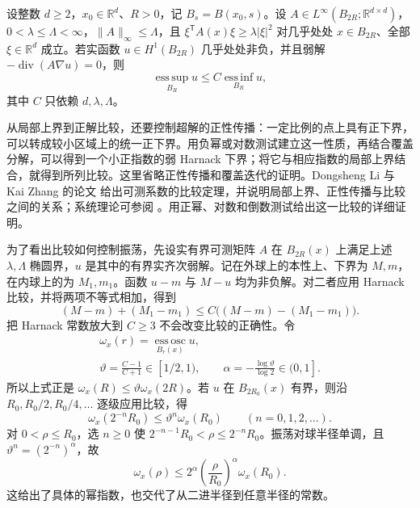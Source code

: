 \begin{theorem}
\label{b2:thm:16-measurable-harnack}
设整数 \(d\geq2\)，\(x_0\in\mathbb R^d\)、\(R>0\)，记 \(B_s=B(x_0,s)\)。设 \(A\in L^\infty(B_{2R};\mathbb R^{d\times d})\)，\(0<\lambda\leq\Lambda<\infty\)，\(\|A\|_\infty\leq\Lambda\)，且 \(\xi^{\mathsf T}A(x)\xi\geq\lambda|\xi|^2\) 对几乎处处 \(x\in B_{2R}\)、全部 \(\xi\in\mathbb R^d\) 成立。若实函数 \(u\in H^1(B_{2R})\) 几乎处处非负，并且弱解 \(-\operatorname{div}(A\nabla u)=0\)，则
\[\operatorname*{ess\,sup}_{B_R}u\le C\operatorname*{ess\,inf}_{B_R}u,\]
其中 \(C\) 只依赖 \(d,\lambda,\Lambda\)。
\end{theorem}
\begin{proofsketch}
从局部上界到正解比较，还要控制超解的正性传播：一定比例的点上具有正下界，可以转成较小区域上的统一正下界。用负幂或对数测试建立这一性质，再结合覆盖分解，可以得到一个小正指数的弱 Harnack 下界；将它与相应指数的局部上界结合，就得到所列比较。这里省略正性传播和覆盖迭代的证明。Dongsheng Li 与 Kai Zhang 的论文 \cite[Theorem 1.1 and Section 2]{Li2017Harnack} 给出可测系数的比较定理，并说明局部上界、正性传播与比较之间的关系；系统理论可参阅 \cite[Chapter 8]{Gilbarg2001Elliptic}。用正幂、对数和倒数测试给出这一比较的详细证明。
\end{proofsketch}

为了看出比较如何控制振荡，先设实有界可测矩阵 \(A\) 在 \(B_{2R}(x)\) 上满足上述 \(\lambda,\Lambda\) 椭圆界，\(u\) 是其中的有界实齐次弱解。记在外球上的本性上、下界为 \(M,m\)，在内球上的为 \(M_1,m_1\)。函数 \(u-m\) 与 \(M-u\) 均为非负解。对二者应用 Harnack 比较，并将两项不等式相加，得到
\[(M-m)+(M_1-m_1)\le C\bigl((M-m)-(M_1-m_1)\bigr).\]
把 Harnack 常数放大到 \(C\geq3\) 不会改变比较的正确性。令
\[
 \begin{gathered}
 \omega_x(r)=\operatorname*{ess\,osc}_{B_r(x)}u,\\
 \vartheta=\frac{C-1}{C+1}\in[1/2,1),
 \qquad\alpha=-\frac{\log\vartheta}{\log2}\in(0,1].
 \end{gathered}
\]
所以上式正是 \(\omega_x(R)\leq\vartheta\omega_x(2R)\)。若 \(u\) 在 \(B_{2R_0}(x)\) 有界，则沿 \(R_0,R_0/2,R_0/4,\ldots\) 逐级应用比较，得
\[\omega_x(2^{-n}R_0)\leq\vartheta^n\omega_x(R_0)
       \qquad(n=0,1,2,\ldots).\]
对 \(0<\rho\leq R_0\)，选 \(n\geq0\) 使 \(2^{-n-1}R_0<\rho\leq2^{-n}R_0\)。振荡对球半径单调，且 \(\vartheta^n=(2^{-n})^\alpha\)，故
\[
 \omega_x(\rho)\leq2^\alpha
       \left(\frac{\rho}{R_0}\right)^\alpha\omega_x(R_0).
\]
这给出了具体的幂指数，也交代了从二进半径到任意半径的常数。


